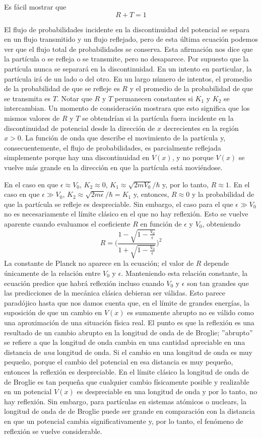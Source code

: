 \documentclass[12pt,a4paper]{article}
\def\e{{\epsilon}} %
\begin{document}
Es fácil mostrar que
\[ R+T=1 \]

El flujo de probabilidades incidente en la discontinuidad del potencial se separa en un flujo transmitido y un flujo reflejado, pero de esta última ecuación podemos ver que el flujo total de probabilidades se conserva. Esta afirmación nos dice que la partícula o se refleja o se transmite, pero no desaparece. Por supuesto que la partícula nunca se separará en la discontinuidad. En un intento en particular, la partícula irá de un lado o del otro. En un largo número de intentos, el promedio de la probabilidad de que se refleje es $R$ y el promedio de la probabilidad de que se transmita es $T$. Notar que $R$ y $T$ permanecen constantes si $K_{1}$ y $K_{2}$ se intercambian. Un momento de consideración mostrara que esto significa que los mismos valores de $R$ y $T$ se obtendrían si la partícula fuera incidente en la discontinuidad de potencial desde la dirección de $x$ decrecientes en la región $x>0$. La función de onda que describe el movimiento de la partícula y, consecuentemente, el flujo de probabilidades, es parcialmente reflejada simplemente porque hay una discontinuidad en $V(x)$, y no porque $V(x)$ se vuelve más grande en la dirección en que la partícula está moviéndose.

En el caso en que $\e \approx V_{0}$, $K_{2} \approx 0$, $K_{1} \approx \sqrt{2mV_{0}}/\hbar$ y, por lo tanto, $R \approx 1$. En el caso en que $\e \gg V_{0}$, $K_{2} \approx \sqrt{2m\e}/\hbar=K_{1}$ y, entonces, $R \approx 0$ y la probabilidad de que la partícula se refleje es despreciable. Sin embargo, el caso para el que $\e \gg V_{0}$ no es necesariamente el límite clásico en el que no hay reflexión. Esto se vuelve aparente cuando evaluamos el coeficiente $R$ en función de $\e$ y $V_{0}$, obteniendo
\[ R= \bigg( \frac{1-\sqrt{1-\frac{V_{0}}{\e}}}{1+\sqrt{1-\frac{V_{0}}{\e}}} \bigg)^{2} \]
La constante de Planck no aparece en la ecuación; el valor de $R$ depende únicamente de la relación entre $V_{0}$ y $\e$. Manteniendo esta relación constante, la ecuación predice que habrá reflexión incluso cuando $V_{0}$ y $\e$ son tan grandes que las predicciones de la mecánica clásica debieran ser válidas. Esto parece paradójico hasta que nos damos cuenta que, en el límite de grandes energías, la suposición de que un cambio en $V(x)$ es sumamente abrupto no es válido como una aproximación de una situación física real. El punto es que la reflexión es una resultado de un cambio abrupto en la longitud de onda de de Broglie; ''abrupto'' se refiere a que la longitud de onda cambia en una cantidad apreciable en una distancia de \emph{una} longitud de onda. Si el cambio en una longitud de onda es muy pequeño, porque el cambio del potencial en esa distancia es muy pequeño, entonces la reflexión es despreciable. En el límite clásico la longitud de onda de de Broglie es tan pequeña que cualquier cambio físicamente posible y realizable en un potencial $V(x)$ es despreciable en una longitud de onda y por lo tanto, no hay reflexión. Sin embargo, para partículas en sistemas atómicos o nuclears, la longitud de onda de de Broglie puede ser grande en comparación con la distancia en que un potencial cambia significativamente y, por lo tanto, el fenómeno de reflexión se vuelve considerable.
\end{document}
